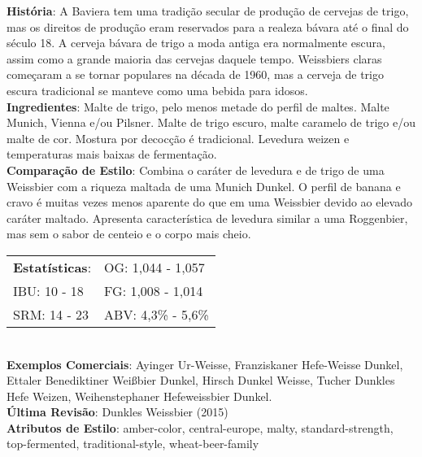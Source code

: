 \textbf{História}: A Baviera tem uma tradição secular de produção de cervejas de trigo, mas os direitos de produção eram reservados para a realeza bávara até o final do século 18. A cerveja bávara de trigo a moda antiga era normalmente escura, assim como a grande maioria das cervejas daquele tempo. Weissbiers claras começaram a se tornar populares na década de 1960, mas a cerveja de trigo escura tradicional se manteve como uma bebida para idosos. \\
\textbf{Ingredientes}: Malte de trigo, pelo menos metade do perfil de maltes. Malte Munich, Vienna e/ou Pilsner. Malte de trigo escuro, malte caramelo de trigo e/ou malte de cor. Mostura por decocção é tradicional. Levedura weizen e temperaturas mais baixas de fermentação. \\
\textbf{Comparação de Estilo}: Combina o caráter de levedura e de trigo de uma Weissbier com a riqueza maltada de uma Munich Dunkel. O perfil de banana e cravo é muitas vezes menos aparente do que em uma Weissbier devido ao elevado caráter maltado. Apresenta característica de levedura similar a uma Roggenbier, mas sem o sabor de centeio e o corpo mais cheio. \\
\begin{tabular}{@{}p{35mm}p{35mm}@{}}
  \textbf{Estatísticas}: & OG: 1,044 - 1,057 \\
  IBU: 10 - 18 & FG: 1,008 - 1,014 \\
  SRM: 14 - 23 & ABV: 4,3\% - 5,6\%
\end{tabular}\\
\textbf{Exemplos Comerciais}: Ayinger Ur-Weisse, Franziskaner Hefe-Weisse Dunkel, Ettaler Benediktiner Weißbier Dunkel, Hirsch Dunkel Weisse, Tucher Dunkles Hefe Weizen, Weihenstephaner Hefeweissbier Dunkel. \\
\textbf{Última Revisão}: Dunkles Weissbier (2015) \\
\textbf{Atributos de Estilo}: amber-color, central-europe, malty, standard-strength, top-fermented, traditional-style, wheat-beer-family

